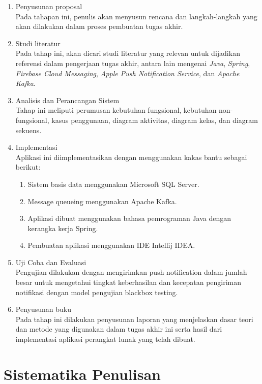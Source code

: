 \begin{enumerate}

\item Penyusunan proposal\\
Pada tahapan ini, penulis akan menyusun rencana dan langkah-langkah yang akan dilakukan dalam proses pembuatan tugas akhir.

\item Studi literatur\\
Pada tahap ini, akan dicari studi literatur yang relevan untuk dijadikan referensi dalam pengerjaan tugas akhir, antara lain mengenai \textit{Java}, \textit{Spring}, \textit{Firebase Cloud Messaging}, \textit{Apple Push Notification Service}, dan \textit{Apache Kafka}.

\item Analisis dan Perancangan Sistem\\
Tahap ini meliputi perumusan kebutuhan fungsional, kebutuhan non-fungsional, kasus penggunaan, diagram aktivitas, diagram kelas, dan diagram sekuens.

\item Implementasi\\
Aplikasi ini diimplementasikan dengan menggunakan kakas bantu sebagai berikut:
\begin{enumerate}
\item Sistem basis data menggunakan Microsoft SQL Server.
\item Message queueing menggunakan Apache Kafka.
\item Aplikasi dibuat menggunakan bahasa pemrograman Java dengan kerangka kerja Spring.
\item Pembuatan aplikasi menggunakan IDE Intellij IDEA.
\end{enumerate}

\item Uji Coba dan Evaluasi\\
Pengujian dilakukan dengan mengirimkan push notification dalam jumlah besar untuk mengetahui tingkat keberhasilan dan kecepatan pengiriman notifikasi dengan model pengujian blackbox testing.

\item Penyusunan buku\\
Pada tahap ini dilakukan penyusunan laporan yang menjelaskan dasar teori dan metode yang digunakan dalam tugas akhir ini serta hasil dari implementasi aplikasi perangkat lunak yang telah dibuat.
\end{enumerate}

\section {Sistematika Penulisan}

